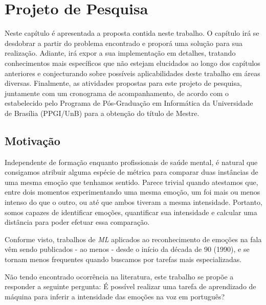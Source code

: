 \chapter{Projeto de Pesquisa}\label{Cap:Projeto de Pesquisa}


Neste capítulo é apresentada a proposta contida neste trabalho. O capítulo irá se desdobrar a partir do problema encontrado e proporá uma solução para sua realização. Adiante, irá expor a sua implementação em detalhes, tratando conhecimentos mais específicos que não estejam elucidados ao longo dos capítulos anteriores e conjecturando sobre possíveis aplicabilidades deste trabalho em áreas diversas. Finalmente, as atividades propostas para este projeto de pesquisa, juntamente com um cronograma de acompanhamento, de acordo com o estabelecido pelo Programa de Pós-Graduação em Informática da Universidade de Brasília (PPGI/UnB) para a obtenção do título de Mestre.\\

\section{Motivação}

Independente de formação enquanto profissionais de saúde mental, é natural que consigamos atribuir alguma espécie de métrica para comparar duas instâncias de uma mesma emoção que tenhamos sentido. Parece trivial quando atestamos que, entre dois momentos experimentando uma mesma emoção, um foi mais ou menos intenso do que o outro, ou até que ambos tiveram a mesma intensidade. Portanto, somos capazes de identificar emoções, quantificar sua intensidade e calcular uma distância para poder efetuar essa comparação.

Conforme visto, trabalhos de \textit{ML} aplicados ao reconhecimento de emoções na fala vêm sendo publicados - ao menos - desde o início da década de 90 (1990), e se tornam menos frequentes quando buscamos por tarefas mais especializadas.

Não tendo encontrado ocorrência na literatura, este trabalho se propõe a responder a seguinte pergunta: É possível realizar uma tarefa de aprendizado de máquina para inferir a intensidade das emoções na voz em português?

